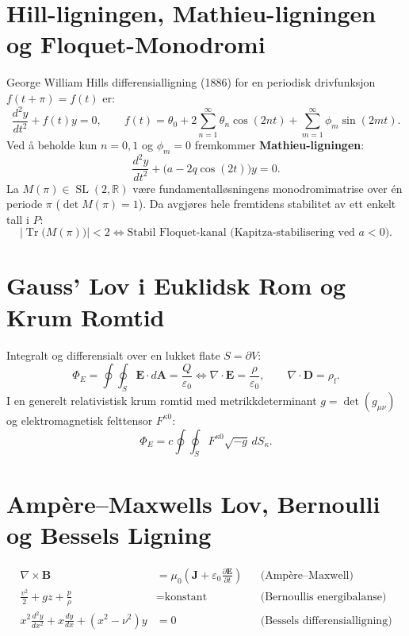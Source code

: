 \documentclass[11pt,a4paper,oneside]{book}
\theoremstyle{definition}
\begin{document}
\section{Hill-ligningen, Mathieu-ligningen og Floquet-Monodromi}
George William Hills differensialligning (1886) for en periodisk drivfunksjon $f(t+\pi) = f(t)$ er:
\begin{equation}
\frac{d^2 y}{dt^2} + f(t)y = 0, \qquad f(t) = \theta_0 + 2\sum_{n=1}^{\infty}\theta_n\cos(2nt) + \sum_{m=1}^{\infty}\phi_m\sin(2mt).
\end{equation}
Ved å beholde kun $n=0,1$ og $\phi_m = 0$ fremkommer \textbf{Mathieu-ligningen}:
\begin{equation}
\frac{d^2 y}{dt^2} + \big(a - 2q\cos(2t)\big)y = 0.
\end{equation}
La $M(\pi) \in \operatorname{SL}(2,\mathbb{R})$ være fundamentalløsningens monodromimatrise over én periode $\pi$ ($\det M(\pi) = 1$). Da avgjøres hele fremtidens stabilitet av ett enkelt tall i $P$:
\begin{equation}
\boxed{\big|\operatorname{Tr}\big(M(\pi)\big)\big| < 2 \iff \text{Stabil Floquet-kanal (Kapitza-stabilisering ved } a < 0\text{)}.}
\end{equation}

\section{Gauss' Lov i Euklidsk Rom og Krum Romtid}
Integralt og differensialt over en lukket flate $S = \partial V$:
\begin{equation}
\Phi_E = \oint\!\!\!\oint_S \mathbf{E}\cdot d\mathbf{A} = \frac{Q}{\varepsilon_0} \iff \nabla\cdot\mathbf{E} = \frac{\rho}{\varepsilon_0}, \qquad \nabla\cdot\mathbf{D} = \rho_{\text{f}}.
\end{equation}
I en generelt relativistisk krum romtid med metrikkdeterminant $g = \det(g_{\mu\nu})$ og elektromagnetisk felttensor $F^{\kappa 0}$:
\begin{equation}
\boxed{\Phi_E = c\oint\!\!\!\oint_S F^{\kappa 0}\sqrt{-g}\,dS_\kappa.}
\end{equation}

\section{Ampère--Maxwells Lov, Bernoulli og Bessels Ligning}
\begin{align}
\nabla \times \mathbf{B} &= \mu_0\left(\mathbf{J} + \varepsilon_0\frac{\partial \mathbf{E}}{\partial t}\right) && \text{(Ampère--Maxwell)} \\
\frac{v^2}{2} + gz + \frac{p}{\rho} &= \text{konstant} && \text{(Bernoullis energibalanse)} \\
x^2\frac{d^2 y}{dx^2} + x\frac{dy}{dx} + (x^2 - \nu^2)y &= 0 && \text{(Bessels differensialligning)}
\end{align}
\end{document}
